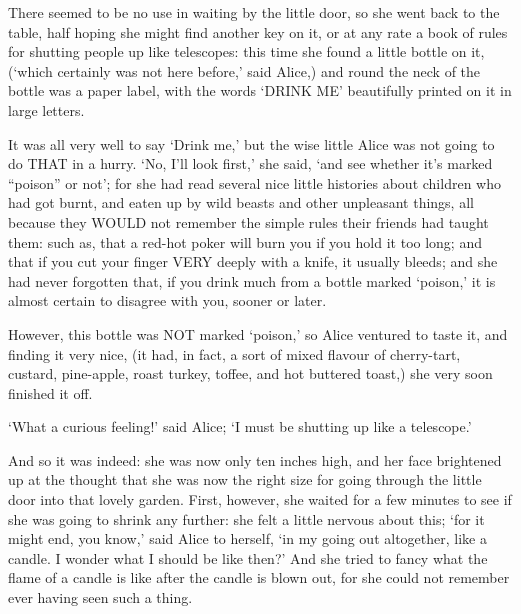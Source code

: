 \documentclass[12pt]{article}
\begin{document}
\begin{Parallel}[p]{}{}
{There seemed to be no use in waiting by the little door, so she went back to the table, half hoping she might find another key on it, or at any rate a book of rules for shutting people up like telescopes: this time she found a little bottle on it, (‘which certainly was not here before,’ said Alice,) and round the neck of the bottle was a paper label, with the words ‘DRINK ME’ beautifully printed on it in large letters.

It was all very well to say ‘Drink me,’ but the wise little Alice was not going to do THAT in a hurry. ‘No, I’ll look first,’ she said, ‘and see whether it’s marked “poison” or not’; for she had read several nice little histories about children who had got burnt, and eaten up by wild beasts and other unpleasant things, all because they WOULD not remember the simple rules their friends had taught them: such as, that a red-hot poker will burn you if you hold it too long; and that if you cut your finger VERY deeply with a knife, it usually bleeds; and she had never forgotten that, if you drink much from a bottle marked ‘poison,’ it is almost certain to disagree with you, sooner or later.

However, this bottle was NOT marked ‘poison,’ so Alice ventured to taste it, and finding it very nice, (it had, in fact, a sort of mixed flavour of cherry-tart, custard, pine-apple, roast turkey, toffee, and hot buttered toast,) she very soon finished it off.

\begin{center}
\quad*\quad*\quad*\quad*\quad*\quad*\quad*
\par
\quad*\quad*\quad*\quad*\quad*\quad*
\par
\quad*\quad*\quad*\quad*\quad*\quad*\quad*
\end{center}

‘What a curious feeling!’ said Alice; ‘I must be shutting up like a telescope.’

And so it was indeed: she was now only ten inches high, and her face brightened up at the thought that she was now the right size for going through the little door into that lovely garden. First, however, she waited for a few minutes to see if she was going to shrink any further: she felt a little nervous about this; ‘for it might end, you know,’ said Alice to herself, ‘in my going out altogether, like a candle. I wonder what I should be like then?’ And she tried to fancy what the flame of a candle is like after the candle is blown out, for she could not remember ever having seen such a thing.

}
\end{Parallel}
\end{document}
